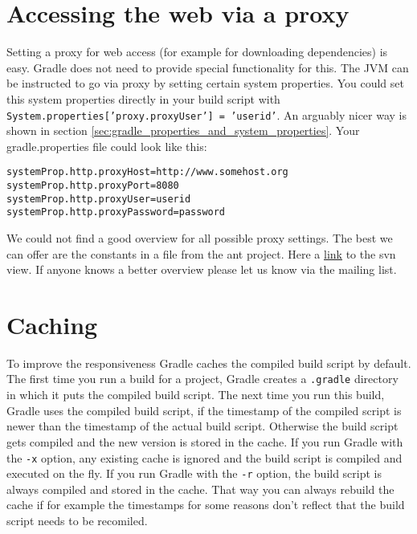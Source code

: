 \section{Accessing the web via a proxy} %
\label{sec:accessing_the_web_via_a_proxy}
Setting a proxy for web access (for example for downloading dependencies) is easy. Gradle does not need to provide special functionality for this. The JVM can be instructed to go via proxy by setting certain system properties. You could set this system properties directly in your build script with \texttt{System.properties['proxy.proxyUser'] = 'userid'}. An arguably nicer way is shown in section \ref{sec:gradle_properties_and_system_properties}. Your gradle.properties file could look like this:
\begin{Verbatim}
systemProp.http.proxyHost=http://www.somehost.org
systemProp.http.proxyPort=8080
systemProp.http.proxyUser=userid
systemProp.http.proxyPassword=password	
\end{Verbatim}
We could not find a good overview for all possible proxy settings. The best we can offer are the constants in a file from the ant project. Here a \href{http://svn.apache.org/viewvc/ant/core/trunk/src/main/org/apache/tools/ant/util/ProxySetup.java?view=markup&pathrev=556977}{link} to the svn view. If anyone knows a better overview please let us know via the mailing list.  

\section{Caching} %
\label{sec:caching}
To improve the responsiveness Gradle caches the compiled build script by default. The first time you run a build for a project, Gradle creates a \texttt{.gradle} directory in which it puts the compiled build script. The next time you run this build, Gradle uses the compiled build script, if the timestamp of the compiled script is newer than the timestamp of the actual build script. Otherwise the build script gets compiled and the new version is stored in the cache. If you run Gradle with the \texttt{-x} option, any existing cache is ignored and the build script is compiled and executed on the fly. If you run Gradle with the \texttt{-r} option, the build script is always compiled and stored in the cache. That way you can always rebuild the cache if for example the timestamps for some reasons don't reflect that the build script needs to be recomiled. 


